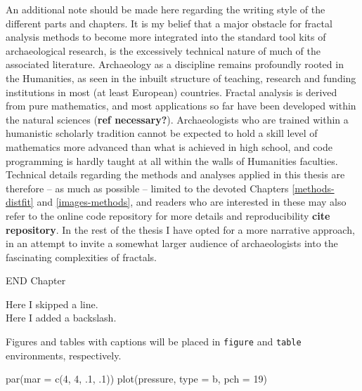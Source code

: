\documentclass[
  12pt,
]{book}
\newenvironment{Shaded}{\begin{snugshade}}{\end{snugshade}}
\newcommand{\AttributeTok}[1]{\textcolor[rgb]{0.77,0.63,0.00}{#1}}
\newcommand{\DecValTok}[1]{\textcolor[rgb]{0.00,0.00,0.81}{#1}}
\newcommand{\FunctionTok}[1]{\textcolor[rgb]{0.00,0.00,0.00}{#1}}
\newcommand{\NormalTok}[1]{#1}
\newcommand{\StringTok}[1]{\textcolor[rgb]{0.31,0.60,0.02}{#1}}
\begin{document}
An additional note should be made here regarding the writing style of the different parts and chapters. It is my belief that a major obstacle for fractal analysis methods to become more integrated into the standard tool kits of archaeological research, is the excessively technical nature of much of the associated literature. Archaeology as a discipline remains profoundly rooted in the Humanities, as seen in the inbuilt structure of teaching, research and funding institutions in most (at least European) countries. Fractal analysis is derived from pure mathematics, and most applications so far have been developed within the natural sciences (\textbf{ref necessary?}). Archaeologists who are trained within a humanistic scholarly tradition cannot be expected to hold a skill level of mathematics more advanced than what is achieved in high school, and code programming is hardly taught at all within the walls of Humanities faculties. Technical details regarding the methods and analyses applied in this thesis are therefore -- as much as possible -- limited to the devoted Chapters \ref{methods-distfit} and \ref{images-methods}, and readers who are interested in these may also refer to the online code repository for more details and reproducibility \textbf{cite repository}. In the rest of the thesis I have opted for a more narrative approach, in an attempt to invite a somewhat larger audience of archaeologists into the fascinating complexities of fractals.

END Chapter

Here I skipped a line.\\
Here I added a backslash.

Figures and tables with captions will be placed in \texttt{figure} and \texttt{table} environments, respectively.

\begin{Shaded}
\begin{Highlighting}[]
\FunctionTok{par}\NormalTok{(}\AttributeTok{mar =} \FunctionTok{c}\NormalTok{(}\DecValTok{4}\NormalTok{, }\DecValTok{4}\NormalTok{, .}\DecValTok{1}\NormalTok{, .}\DecValTok{1}\NormalTok{))}
\FunctionTok{plot}\NormalTok{(pressure, }\AttributeTok{type =} \StringTok{\textquotesingle{}b\textquotesingle{}}\NormalTok{, }\AttributeTok{pch =} \DecValTok{19}\NormalTok{)}
\end{Highlighting}
\end{Shaded}
\end{document}

